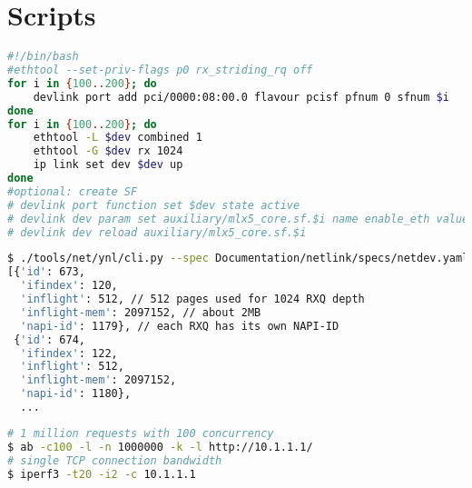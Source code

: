 \section{Scripts} \label{sec:bash_script}

\begin{lstlisting}[language=sh, caption={SF-representor setup on BlueField}, label={lst:sf}]
#!/bin/bash
#ethtool --set-priv-flags p0 rx_striding_rq off
for i in {100..200}; do
    devlink port add pci/0000:08:00.0 flavour pcisf pfnum 0 sfnum $i
done
for i in {100..200}; do
    ethtool -L $dev combined 1
    ethtool -G $dev rx 1024
    ip link set dev $dev up
done	
#optional: create SF
# devlink port function set $dev state active
# devlink dev param set auxiliary/mlx5_core.sf.$i name enable_eth value 1 cmode driverinit
# devlink dev reload auxiliary/mlx5_core.sf.$i
\end{lstlisting}

\begin{lstlisting}[language=sh, caption={Collect page\_pool usage on BlueField}, label={lst:bash_script}]
$ ./tools/net/ynl/cli.py --spec Documentation/netlink/specs/netdev.yaml  --dump page-pool-get
[{'id': 673,
  'ifindex': 120,
  'inflight': 512, // 512 pages used for 1024 RXQ depth
  'inflight-mem': 2097152, // about 2MB
  'napi-id': 1179}, // each RXQ has its own NAPI-ID
 {'id': 674,
  'ifindex': 122,
  'inflight': 512,
  'inflight-mem': 2097152,
  'napi-id': 1180},
  ...
\end{lstlisting}

\begin{lstlisting}[language=sh, caption={Apache ab and iperf3 test}, label={lst:ab}]
# 1 million requests with 100 concurrency
$ ab -c100 -l -n 1000000 -k -l http://10.1.1.1/
# single TCP connection bandwidth
$ iperf3 -t20 -i2 -c 10.1.1.1
\end{lstlisting}

